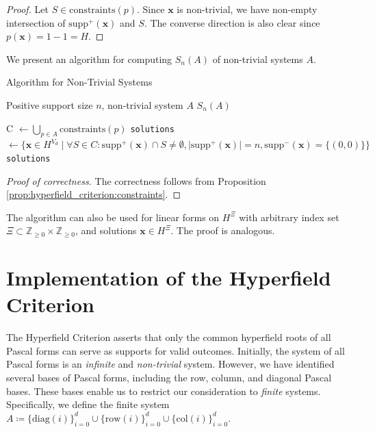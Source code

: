 \begin{proof}
    Let $S \in \mathrm{constraints}(p)$.
Since $\mathbf{x}$ is non-trivial, we have non-empty intersection of $\mathrm{supp}^+(\mathbf{x})$ and $S$. The converse direction is also clear since $p(\mathbf{x}) = 1 - 1 = H$.
\end{proof}

We present an algorithm for computing $S_{n}(A)$ of non-trivial systems $A$.

\begin{algorithm}
\caption{Algorithm for Non-Trivial Systems}\label{alg:hyperfield_criterion:efficient}
    \begin{algorithmic}[1]
    \Require Positive support size $n$, non-trivial system $A$ 
    \Ensure $S_{n}(A)$

        \State C $\gets \bigcup_{p \in A}\mathrm{constraints}(p)$
        \State \texttt{solutions} $\gets \{ \mathbf{x} \in H^{V_{d}} \mid \forall S \in C: \mathrm{supp}^+(\mathbf{\mathbf{x}}) \cap S \neq \emptyset, \vert \mathrm{supp}^+(\mathbf{x}) \vert = n,  \mathrm{supp}^-(\mathbf{x}) = \{(0,0)\}   \}$
        \State \Return \texttt{solutions}
    \EndFunction
    \end{algorithmic}  
\end{algorithm}


\begin{proof}[Proof of correctness]
The correctness follows from Proposition \ref{prop:hyperfield_criterion:constraints}.
\end{proof}

\begin{remark}\label{rem:fiuhwiu3}
    The algorithm can also be used for linear forms on \( H^{\Xi} \) with arbitrary index set \( \Xi \subset \mathbb{Z}_{\geq 0} \times \mathbb{Z}_{\geq 0} \), and solutions \( \mathbf{x} \in H^{\Xi} \). The proof is analogous.
\end{remark}

\section{Implementation of the Hyperfield Criterion}

The Hyperfield Criterion asserts that only the common hyperfield roots of all Pascal forms can serve as supports for valid outcomes. Initially, the system of all Pascal forms is an \emph{infinite} and \emph{non-trivial} system. However, we have identified several bases of Pascal forms, including the row, column, and diagonal Pascal bases. These bases enable us to restrict our consideration to \emph{finite} systems. Specifically, we define the finite system \( A \coloneqq \{ \mathrm{diag}(i) \}_{i=0}^d \cup \{ \mathrm{row}(i)\}^d_{i=0} \cup \{ \mathrm{col}(i) \}^d_{i=0} \).

